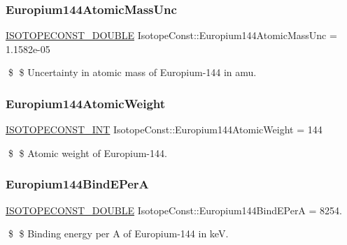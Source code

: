 \subsubsection{\texorpdfstring{Europium144\+Atomic\+Mass\+Unc}{Europium144AtomicMassUnc}}
{\footnotesize\ttfamily \mbox{\hyperlink{group___isotope_const-_macros_ga8f45a7272ce02c0b4c65c44636ed719a}{I\+S\+O\+T\+O\+P\+E\+C\+O\+N\+S\+T\+\_\+\+D\+O\+U\+B\+LE}} Isotope\+Const\+::\+Europium144\+Atomic\+Mass\+Unc = 1.\+1582e-\/05}

\$ \$ Uncertainty in atomic mass of Europium-\/144 in amu. \mbox{\label{group___isotope_const-_europium-_eu144_gae588a85f1566033bd2425e816f3092d4}} 
\subsubsection{\texorpdfstring{Europium144\+Atomic\+Weight}{Europium144AtomicWeight}}
{\footnotesize\ttfamily \mbox{\hyperlink{group___isotope_const-_macros_ga5f18360b3e99483a35c32d789e62621c}{I\+S\+O\+T\+O\+P\+E\+C\+O\+N\+S\+T\+\_\+\+I\+NT}} Isotope\+Const\+::\+Europium144\+Atomic\+Weight = 144}

\$ \$ Atomic weight of Europium-\/144. \mbox{\label{group___isotope_const-_europium-_eu144_ga182b7be7b0dadf42f1bcff5bb3ea725c}} 
\subsubsection{\texorpdfstring{Europium144\+Bind\+E\+PerA}{Europium144BindEPerA}}
{\footnotesize\ttfamily \mbox{\hyperlink{group___isotope_const-_macros_ga8f45a7272ce02c0b4c65c44636ed719a}{I\+S\+O\+T\+O\+P\+E\+C\+O\+N\+S\+T\+\_\+\+D\+O\+U\+B\+LE}} Isotope\+Const\+::\+Europium144\+Bind\+E\+PerA = 8254.}

\$ \$ Binding energy per A of Europium-\/144 in keV. \mbox{\label{group___isotope_const-_europium-_eu144_ga8b9f4eedad0b5a5d5ea273c45e83005d}} 

